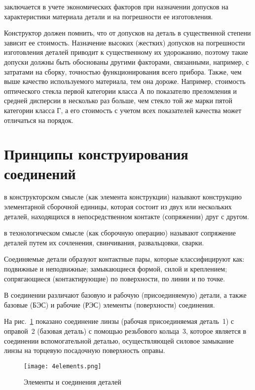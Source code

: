  заключается в учете экономических факторов при назначении допусков на характеристики материала детали и на погрешности ее изготовления.

Конструктор должен помнить, что от допусков на деталь в существенной степени зависит ее стоимость. 
Назначение высоких (жестких) допусков на погрешности изготовления деталей приводит к существенному их удорожанию, поэтому такие допуски должны быть обоснованы другими факторами, связанными, например, с затратами на сборку, точностью функционирования всего прибора. 
Также,  чем выше качество используемого материала, тем она дороже. 
Например, стоимость оптического стекла первой категории класса А по показателю преломления и средней дисперсии в несколько раз больше, чем стекло той же марки пятой категории класса Г, а его стоимость с учетом всех показателей качества может отличаться на порядок.

\section{Принципы конструирования соединений}

 в конструкторском смысле (как элемента конструкции) называют конструкцию элементарной сборочной единицы, которая состоит из двух или нескольких деталей, находящихся в непосредственном контакте (сопряжении) друг с другом. 

 в технологическом смысле (как сборочную операцию) называют сопряжение деталей путем их сочленения, свинчивания, развальцовки, сварки.

Соединяемые детали образуют контактные пары, которые классифицируют как: подвижные и неподвижные; замыкающиеся формой, силой и креплением; сопрягающиеся (контактирующие) по поверхности, по линии и по точке.

В соединении различают базовую и рабочую (присоединяемую) детали, а также базовые (БЭС) и рабочие (РЭС) элементы (поверхности) соединения.

На рис.~\ref{pic:4elements} показано соединение линзы (рабочая присоединяемая деталь~1) с оправой~2 (базовая деталь) с помощью резьбового кольца~3, которое является в соединении вспомогательной деталью, осуществляющей силовое замыкание линзы на торцевую посадочную поверхность оправы.

\begin{figure}
	\begin{center}
		\texttt{[image: 4elements.png]}
		\label{pic:4elements}
		\caption{Элементы и соединения деталей}
	\end{center}
\end{figure}


